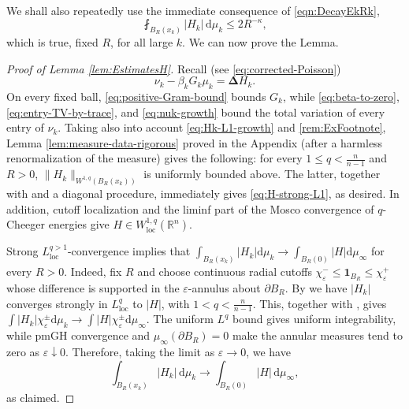 \documentclass[12pt,a4paper,reqno]{amsart}
\renewcommand{\leq}{\leqslant}
\newcommand{\loc}{\mathrm{loc}}
\begin{document}
We shall also repeatedly use the immediate consequence of
\eqref{eqn:DecayEkRk},
\begin{equation}\label{eq:Hk-L1-growth}
 \fint_{B_R(x_k)}|H_k|\,\mathrm{d}\mu_k\leq 2R^{-\kappa},
\end{equation}
which is true, fixed $R$, for all large $k$. We can now prove the Lemma.
\begin{proof}[Proof of Lemma \ref{lem:EstimatesH}]
Recall (see \eqref{eq:corrected-Poisson})
\[
 \nu_k-\beta_kG_k\mu_k=\mathbf{\Delta}H_k.
\]
On every fixed ball, \eqref{eq:positive-Gram-bound} bounds $G_k$,
while \eqref{eq:beta-to-zero}, \eqref{eq:entry-TV-by-trace}, and
\eqref{eq:nuk-growth} bound the total variation of every entry of
$\nu_k$.  Taking also into account \eqref{eq:Hk-L1-growth} and \cref{rem:ExFootnote}, Lemma \ref{lem:measure-data-rigorous} proved in the
Appendix (after a harmless renormalization of the measure) gives the
following: for every $1\leq q<\frac{n}{n-1}$ and $R>0$,
$\|H_k\|_{W^{1,q}(B_R(x_k))}$ is uniformly bounded above. The latter,
together with \cite[Proposition 3.39]{HondaLp} and a diagonal procedure,
immediately gives \eqref{eq:H-strong-L1}, as desired.  In addition,
cutoff localization and the liminf part of the Mosco convergence of
$q$-Cheeger energies \cite[Theorem 1.8.1]{AmbrosioHonda} give $H\in W^{1,q}_{\loc}(\mathbb R^n)$.

Strong $L^{q>1}_{\loc}$-convergence implies that
$\int_{B_R(x_k)}|H_k|\mathrm{d}\mu_k\to \int_{B_R(0)}|H|\mathrm{d}\mu_\infty$ for every
$R>0$. Indeed, fix $R$ and choose continuous radial cutoffs
$\chi^-_\varepsilon\le\mathbf1_{B_R}\le\chi^+_\varepsilon$ whose
difference is supported in the $\varepsilon$-annulus about
$\partial B_R$. By \cite[Corollary 3.28]{HondaLp} we have $|H_k|$
converges strongly in $L^q_{\mathrm{loc}}$ to $|H|$, with
$1<q<\frac{n}{n-1}$. This, together with
\cite[Proposition 3.27]{HondaLp}, gives
$\int |H_k|\chi_\varepsilon^{\pm}\mathrm{d}\mu_k \to
\int |H|\chi_{\varepsilon}^{\pm}\mathrm{d}\mu_\infty$.  The uniform $L^q$
bound gives uniform integrability, while pmGH convergence and
$\mu_\infty(\partial B_R)=0$ make the annular measures tend to zero
as $\varepsilon\downarrow0$.  Therefore, taking the limit as
$\varepsilon\to 0$, we have
\[
\int_{B_R(x_k)}|H_k|\,\mathrm{d}\mu_k\to
\int_{B_R(0)}|H|\,\mathrm{d}\mu_\infty,
\]
as claimed.


\end{proof}
\end{document}
